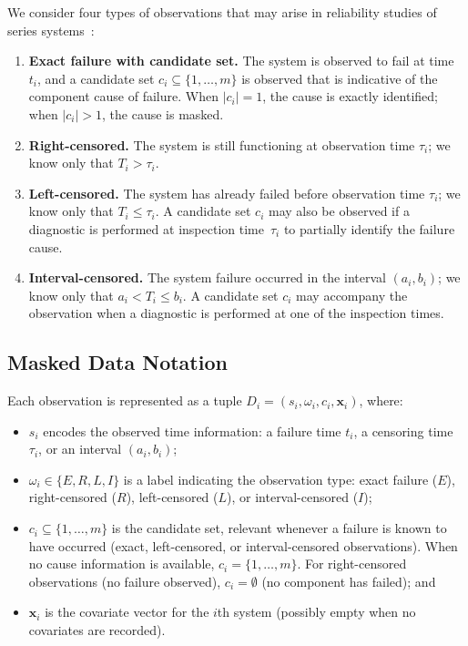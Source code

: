 \documentclass[11pt]{article}
\theoremstyle{definition}
\theoremstyle{plain}
\renewcommand{\v}[1]{\boldsymbol{#1}}
\begin{document}
We consider four types of observations that may arise in reliability
studies of series systems~\citep[see][for background on censored data
in survival analysis]{klein2005survival}:

\begin{enumerate}
    \item \textbf{Exact failure with candidate set.}
    The system is observed to fail at time $t_i$, and a candidate set
    $c_i \subseteq \{1, \ldots, m\}$ is observed that is indicative of
    the component cause of failure.
    When $|c_i| = 1$, the cause is exactly identified;
    when $|c_i| > 1$, the cause is masked.

    \item \textbf{Right-censored.}
    The system is still functioning at observation time $\tau_i$;
    we know only that $T_i > \tau_i$.

    \item \textbf{Left-censored.}
    The system has already failed before observation time $\tau_i$;
    we know only that $T_i \leq \tau_i$.
    A candidate set $c_i$ may also be observed if a diagnostic is
    performed at inspection time~$\tau_i$ to partially identify the
    failure cause.

    \item \textbf{Interval-censored.}
    The system failure occurred in the interval $(a_i, b_i)$;
    we know only that $a_i < T_i \leq b_i$.
    A candidate set $c_i$ may accompany the observation when a
    diagnostic is performed at one of the inspection times.
\end{enumerate}

\subsection{Masked Data Notation}
\label{sec:masked-data-notation}

Each observation is represented as a tuple
$D_i = (s_i, \omega_i, c_i, \v{x}_i)$, where:
\begin{itemize}
    \item $s_i$ encodes the observed time information: a failure time $t_i$,
    a censoring time $\tau_i$, or an interval $(a_i, b_i)$;
    \item $\omega_i \in \{E, R, L, I\}$ is a label indicating the
    observation type: exact failure ($E$), right-censored ($R$),
    left-censored ($L$), or interval-censored ($I$);
    \item $c_i \subseteq \{1, \ldots, m\}$ is the candidate set, relevant
    whenever a failure is known to have occurred (exact, left-censored,
    or interval-censored observations).
    When no cause information is available, $c_i = \{1, \ldots, m\}$.
    For right-censored observations (no failure observed),
    $c_i = \emptyset$ (no component has failed); and
    \item $\v{x}_i$ is the covariate vector for the $i$th system
    (possibly empty when no covariates are recorded).
\end{itemize}
\end{document}

